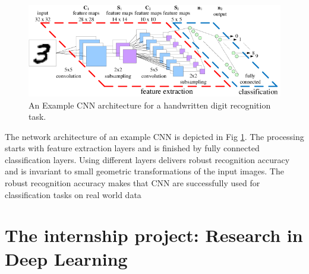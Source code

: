 \documentclass[hidelinks,12pt,a4paper]{report}
\begin{document}
\begin{figure}[ht]
	\includegraphics[scale=1, center]{images/Fig-1-An-Example-CNN-architecture-for-a-handwritten-digit-recognition-task}
	\caption{An Example CNN architecture for a handwritten digit recognition task.}
	\label{fig:CNN-architecture}
\end{figure}
The network architecture of an example CNN is depicted in Fig \ref{fig:CNN-architecture}. The processing starts with feature extraction layers and is finished by fully connected classification layers. Using different layers delivers robust recognition accuracy and is invariant to small geometric transformations of the input images. The robust recognition accuracy makes that CNN are successfully used for classification tasks on real world data

\chapter{The internship project: Research in Deep Learning}
\end{document}
